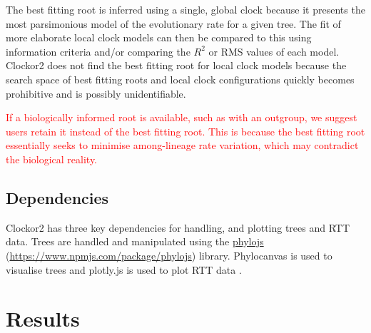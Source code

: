 \documentclass{article}
\begin{document}
The best fitting root is inferred using a single, global clock because it presents the most parsimonious model of the evolutionary rate for a given tree. The fit of more elaborate local clock models can then be compared to this using information criteria and/or comparing the $R^2$ or RMS
values of each model. Clockor2 does not find the best fitting root for local clock models because the search space of best fitting roots and local clock configurations quickly becomes prohibitive and is possibly unidentifiable.

\textcolor{red}{If a biologically informed root is available, such as with an outgroup, we suggest users retain it instead of the best fitting root. This is because the best fitting root essentially seeks to minimise among-lineage rate variation, which may contradict the biological reality.}

\subsection*{Dependencies}
Clockor2 has three key dependencies for handling, and plotting trees and RTT data. Trees are handled and manipulated using the \href{https://www.npmjs.com/package/phylojs}{phylojs} (\url{https://www.npmjs.com/package/phylojs}) library. Phylocanvas is used to visualise trees and plotly.js is used to plot RTT data \citep{abudahab_phylocanvasgl_2021,plotly}.

\section*{Results}
\end{document}
